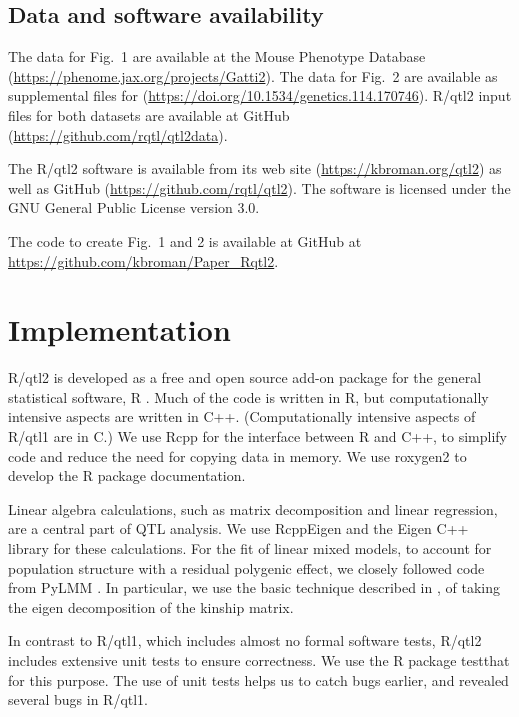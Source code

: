 \documentclass[12pt,letterpaper]{article}
\begin{document}
\subsection*{Data and software availability}

The data for Fig.~1 are available at the Mouse Phenotype Database
(\url{https://phenome.jax.org/projects/Gatti2}).
The data for Fig.~2 are available as supplemental files for
\citet{gnan2014} (\url{https://doi.org/10.1534/genetics.114.170746}).
R/qtl2
input files for both datasets are available at GitHub
(\url{https://github.com/rqtl/qtl2data}).

The R/qtl2 software is available from its web site
(\url{https://kbroman.org/qtl2}) as well as GitHub
(\url{https://github.com/rqtl/qtl2}). The software is licensed under
the GNU General Public License version 3.0.

The code to create Fig.~1 and 2 is available at GitHub at
\url{https://github.com/kbroman/Paper_Rqtl2}.

\clearpage
\section*{Implementation}

R/qtl2 is developed as a free and open source
add-on package for the general statistical software, R
\citep{RCore}. Much of the code is written in R, but computationally
intensive aspects are written in C++.  (Computationally intensive
aspects of R/qtl1 are in C.) We use Rcpp
\citep{eddelbuettel2011,Rcppbook} for the interface between R and C++,
to simplify code and reduce the need for copying data in memory.
We use roxygen2 \citep{roxygen2} to develop the R package documentation.

Linear algebra calculations, such as matrix decomposition and linear
regression, are a central part of QTL analysis. We use
RcppEigen \citep{RcppEigen} and the Eigen C++ library \citep{eigen}
for these calculations. For the fit of linear mixed models, to account
for population structure with a residual polygenic effect, we closely
followed code from PyLMM \citep{pylmm}. In particular, we use the
basic technique described in \citet{kang2008}, of taking the eigen
decomposition of the kinship matrix.

In contrast to R/qtl1, which includes almost no formal software tests,
R/qtl2 includes extensive unit tests to ensure correctness. We use the
R package testthat \citep{testthat} for this purpose. The use of unit
tests helps us to catch bugs earlier, and revealed several bugs in
R/qtl1.
\end{document}
